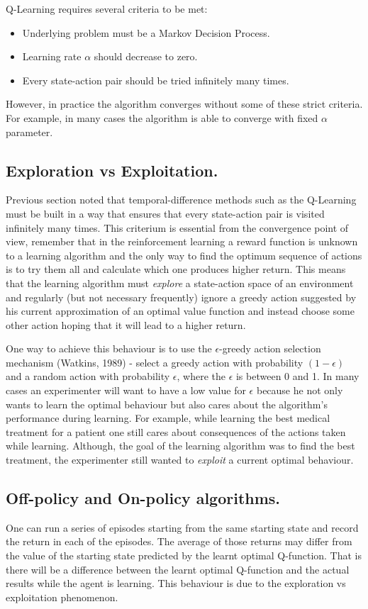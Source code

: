 Q-Learning requires several criteria to be met:
\begin{itemize}
  \item Underlying problem must be a Markov Decision Process.
  \item Learning rate $ \alpha $ should decrease to zero.
  \item Every state-action pair should be tried infinitely many times.
\end{itemize}
However, in practice the algorithm converges without some of these strict criteria. For example, in many cases the algorithm is able to converge with fixed $ \alpha $ parameter.

\subsection{Exploration vs Exploitation.}
Previous section noted that temporal-difference methods such as the Q-Learning must be built in a way that ensures that every state-action pair is visited infinitely many times. This criterium is essential from the convergence point of view, remember that in the reinforcement learning a reward function is unknown to a learning algorithm and the only way to find the optimum sequence of actions is to try them all and calculate which one produces higher return. This means that the learning algorithm must \textit{explore} a state-action space of an environment and regularly (but not necessary frequently) ignore a greedy action suggested by his current approximation of an optimal value function and instead choose some other action hoping that it will lead to a higher return.

One way to achieve this behaviour is to use the $\epsilon$-greedy action selection mechanism (Watkins, 1989\nocite{watkins1989learning}) - select a greedy action with probability $(1-\epsilon)$ and a random action with probability $\epsilon$, where the $\epsilon$ is between 0 and 1. In many cases an experimenter will want to have a low value for $\epsilon$ because he not only wants to learn the optimal behaviour but also cares about the algorithm's performance during learning. For example, while learning the best medical treatment for a patient one still cares about consequences of the actions taken while learning. Although, the goal of the learning algorithm was to find the best treatment, the experimenter still wanted to \textit{exploit} a current optimal behaviour.

\subsection{Off-policy and On-policy algorithms.}
One can run a series of episodes starting from the same starting state and record the return in each of the episodes. The average of those returns may differ from the value of the starting state predicted by the learnt optimal Q-function. That is there will be a difference between the learnt optimal Q-function and the actual results while the agent is learning. This behaviour is due to the exploration vs exploitation phenomenon.

